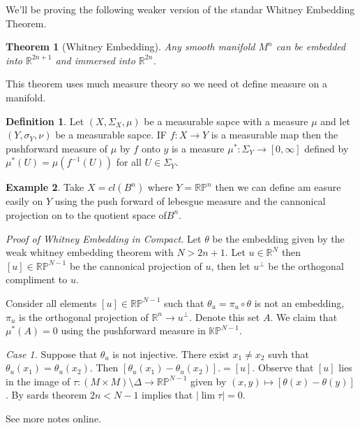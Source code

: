 \documentclass[11pt]{amsart}
\newtheorem{theorem}{Theorem}    %
\theoremstyle{definition}
\newtheorem{definition}{Definition}
\newtheorem{example}[definition]{Example}
\def\projspace{{ \mathbb{K}\mathbb{P} }}
\begin{document}
\noindent We'll be proving the following weaker version of the standar Whitney Embedding Theorem.

\begin{theorem}[Whitney Embedding] Any smooth manifold $M^n$ can be embedded into $\mathbb{R}^{2n+1}$ and immersed into $\mathbb{R}^{2n}$.
\end{theorem}

\noindent This theorem uses much measure theory so we need ot define measure on a manifold.

\begin{definition}
	Let $(X, \Sigma_X, \mu)$ be a measurable sapce with a measure $\mu$ and let $(Y, \sigma_Y, \nu)$ be a measurable sapce. IF $f: X \to Y$ is a measurable map then the pushforward measure of $\mu$ by $f$ onto $y$ is a measure $\mu^*: \Sigma_Y \to [0, \infty]$ defined by $\mu^*(U) = \mu(f^{-1}(U))$ for all $U \in \Sigma_Y.$ 
\end{definition}

\begin{example}
	Take $X = cl(B^n)$ where $Y = \mathbb{R}\mathbb{P}^n$ then we can define am easure easily on $Y$ using the push forward of lebesgue measure and the cannonical projection on to the quotient space of$B^n.$
\end{example}

\emph{Proof of Whitney Embedding in Compact.} Let $\theta$ be the embedding given by the weak whitney embedding theorem with $N > {2n+1}$. Let $u \in \mathbb{R}^N$ then $[{u}] \in \mathbb{R}\mathbb{P}^{N-1}$ be the cannonical projection of $u$, then let $u^\perp$ be the orthogonal compliment to $u.$ 

Consider all elements $[{u}] \in \mathbb{R}\mathbb{P}^{N-1}$ such that $\theta_u = \pi_u \circ \theta$ is not an embedding, $\pi_u$ is the orthogonal projection of $\mathbb{R}^n \to u^\perp.$ Denote this set $A.$ We claim that $\mu^*(A) = 0$ using the pushforward measure in $\projspace^{N-1}.$

\emph{Case 1.} Suppose that $\theta_u$ is not injective. There exist $x_1 \neq x_2$ suvh that $\theta_u(x_1) = \theta_u(x_2).$ Then $[\theta_u(x_1) - \theta_u(x_2)] .= [u]$. Observe that $[u]$ lies in the image of  $\tau : (M \times M) \setminus \Delta \to \mathbb{R}\mathbb{P}^{N-1}$ given by $(x,y) \mapsto [\theta(x) - \theta(y)]$. By sards theorem $2n < N-1$ implies that $|\lim \tau| = 0$.


See more notes online.
\end{document}
